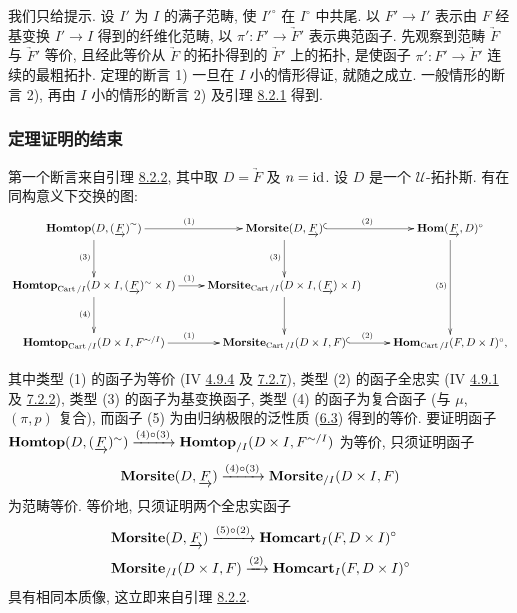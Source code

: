 我们\pageoriginale{}只给提示.
设 $I'$ 为 $I$ 的满子范畴,
使 ${I'}^{\circ}$ 在 $I^{\circ}$ 中共尾.
以 $F'\to I'$ 表示由 $F$ 经基变换 $I'\to I$ 得到的纤维化范畴,
以 $\pi':F'\to\underrightarrow{F}'$ 表示典范函子.
先观察到范畴 $\underrightarrow{F}$ 与 $\underrightarrow{F}'$ 等价,
且经此等价从 $\underrightarrow{F}$ 的拓扑得到的
$\underrightarrow{F}'$ 上的拓扑,
是使函子 $\pi':F'\to\underrightarrow{F}'$ 连续的最粗拓扑.
定理的断言 1) 一旦在 $I$ 小的情形得证, 就随之成立.
一般情形的断言 2), 再由 $I$ 小的情形的断言 2)
及引理 \hyperref[VI.lem8.2.1]{8.2.1} 得到.

\subsubsection{定理证明的结束}
第一个断言来自引理 \hyperref[VI.lem8.2.2]{8.2.2},
其中取 $D=\underrightarrow{F}$ 及 $n=\operatorname{id}$.
设 $D$ 是一个 $𝒰$-拓扑斯.
有在同构意义下交换的图:
{\def\objectstyle{\scriptstyle}
\def\labelstyle{\scriptstyle}
\[
\xymatrix@C=.8cm@R=1.15cm{
\Hhomtop(D,{(\underrightarrow{F})}^{\sim}) \ar[r]^{(1)}\ar[d]_{(3)}&
\Mmorsite(D,\underrightarrow{F}) \ar@{^{(}->}[r]^{(2)} \ar[d]_{(3)}&
\Hhom(\underrightarrow{F},D)^{\circ}\ar[dd]_{(5)}\\
\Hhomtop_{\Cart/I}(D\times I,(\underrightarrow{F})^{\sim}\times
I)  \ar[r]^{(1)} \ar[d]_{(4)}& \Mmorsite_{\Cart/I}(D\times I,
(\underrightarrow{F})\times I) \ar[d]&\\
\Hhomtop_{\Cart/I}(D\times I,F^{\sim/I})
\ar[r]^{(1)} & \Mmorsite_{\Cart/I}(D\times I,F)  \ar@{^{(}->}[r]^{(2)} &
\Hhom_{\Cart/I}(F,D\times I)^{\circ},
}
\]}

\noindent 其中类型 (1) 的函子为等价
(IV \hyperref[IV.prop4.9.4]{4.9.4} 及 \hyperref[VI.prop7.2.7]{7.2.7}),
类型 (2) 的函子全忠实
(IV \hyperref[IV.subsubsec4.9.1]{4.9.1} 及 \hyperref[IV.eq7.2.2]{7.2.2}),
类型 (3) 的函子为基变换函子,
类型 (4) 的函子为复合函子
(与 $\mu$, \resp $(\pi,p)$ 复合),
而函子 (5) 为由归纳极限的泛性质
(\hyperref[VI.def6.3]{6.3}) 得到的等价.
要证明函子
$\operatorname{\mathbf{Homtop}}(D,(\underrightarrow{F})^{\sim})\xrightarrow{(4)\circ(3)}
\operatorname{\mathbf{Homtop}}_{/I}(D\times I,F^{\sim/I})$ 为等价,
只须证明函子
$$
\operatorname{\mathbf{Morsite}}(D, \underrightarrow{F})
\xrightarrow{(4) \circ (3)} \operatorname{\mathbf{Morsite}}_{/I}(D \times I,F)
$$
为范畴\pageoriginale{}等价.
等价地, 只须证明两个全忠实函子
\begin{align*}
& \operatorname{\mathbf{Morsite}}(D, \underrightarrow{F}) \xrightarrow{(5) \circ (2)} \operatorname{\mathbf{Homcart}}_I(F, D \times I)^{\circ}\\
& \operatorname{\mathbf{Morsite}}_{/I}(D \times I, F) \xrightarrow{(2)} \operatorname{\mathbf{Homcart}}_I(F, D \times
I)^{\circ}
\end{align*}
具有相同本质像,
这立即来自引理 \hyperref[VI.lem8.2.2]{8.2.2}.

